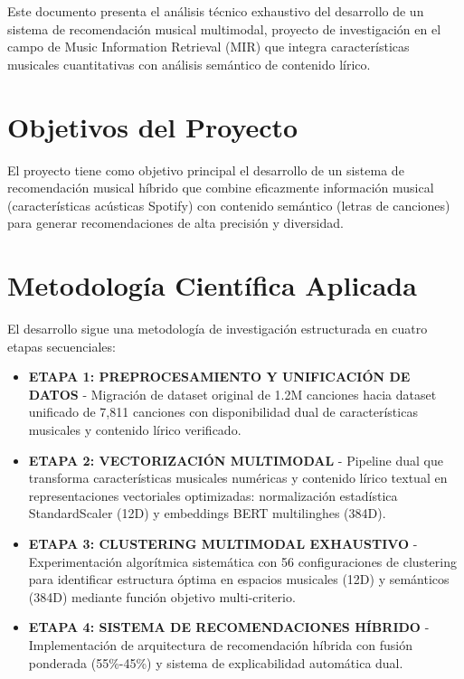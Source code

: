 \documentclass[12pt,a4paper]{report}
\begin{document}
Este documento presenta el análisis técnico exhaustivo del desarrollo de un sistema de recomendación musical multimodal, proyecto de investigación en el campo de Music Information Retrieval (MIR) que integra características musicales cuantitativas con análisis semántico de contenido lírico.

\section*{Objetivos del Proyecto}

El proyecto tiene como objetivo principal el desarrollo de un sistema de recomendación musical híbrido que combine eficazmente información musical (características acústicas Spotify) con contenido semántico (letras de canciones) para generar recomendaciones de alta precisión y diversidad.

\section*{Metodología Científica Aplicada}

El desarrollo sigue una metodología de investigación estructurada en cuatro etapas secuenciales:

\begin{itemize}
\item \textbf{ETAPA 1: PREPROCESAMIENTO Y UNIFICACIÓN DE DATOS} - Migración de dataset original de 1.2M canciones hacia dataset unificado de 7,811 canciones con disponibilidad dual de características musicales y contenido lírico verificado.

\item \textbf{ETAPA 2: VECTORIZACIÓN MULTIMODAL} - Pipeline dual que transforma características musicales numéricas y contenido lírico textual en representaciones vectoriales optimizadas: normalización estadística StandardScaler (12D) y embeddings BERT multilinghes (384D).

\item \textbf{ETAPA 3: CLUSTERING MULTIMODAL EXHAUSTIVO} - Experimentación algorítmica sistemática con 56 configuraciones de clustering para identificar estructura óptima en espacios musicales (12D) y semánticos (384D) mediante función objetivo multi-criterio.

\item \textbf{ETAPA 4: SISTEMA DE RECOMENDACIONES HÍBRIDO} - Implementación de arquitectura de recomendación híbrida con fusión ponderada (55\%-45\%) y sistema de explicabilidad automática dual.
\end{itemize}
\end{document}
